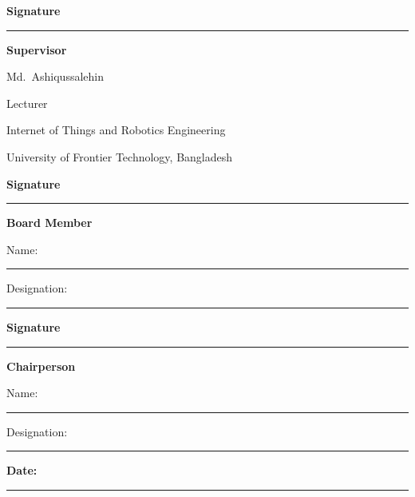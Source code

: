 \noindent
\begin{minipage}[t]{0.46\textwidth}
\textbf{Signature}
\vspace{0.8cm}

\hrule
\vspace{0.25cm}

\textbf{Supervisor}

\vspace{0.25cm}

Md.\ Ashiqussalehin

\vspace{0.15cm}

Lecturer

\vspace{0.15cm}

Internet of Things and Robotics Engineering

\vspace{0.15cm}

University of Frontier Technology, Bangladesh
\end{minipage}
\hfill
\begin{minipage}[t]{0.46\textwidth}
\textbf{Signature}
\vspace{0.8cm}

\hrule
\vspace{0.25cm}

\textbf{Board Member}

\vspace{0.25cm}

Name: \rule{3.2cm}{0.4pt}

\vspace{0.25cm}

Designation: \rule{2.7cm}{0.4pt}
\end{minipage}

\vspace{1.8cm}

\noindent
\begin{center}
\begin{minipage}[t]{0.46\textwidth}
\textbf{Signature}
\vspace{0.8cm}

\hrule
\vspace{0.25cm}

\textbf{Chairperson}

\vspace{0.25cm}

Name: \rule{3.2cm}{0.4pt}

\vspace{0.25cm}

Designation: \rule{2.7cm}{0.4pt}
\end{minipage}
\end{center}

\vspace{1.0cm}

\noindent
\textbf{Date:} \rule{4cm}{0.4pt}
